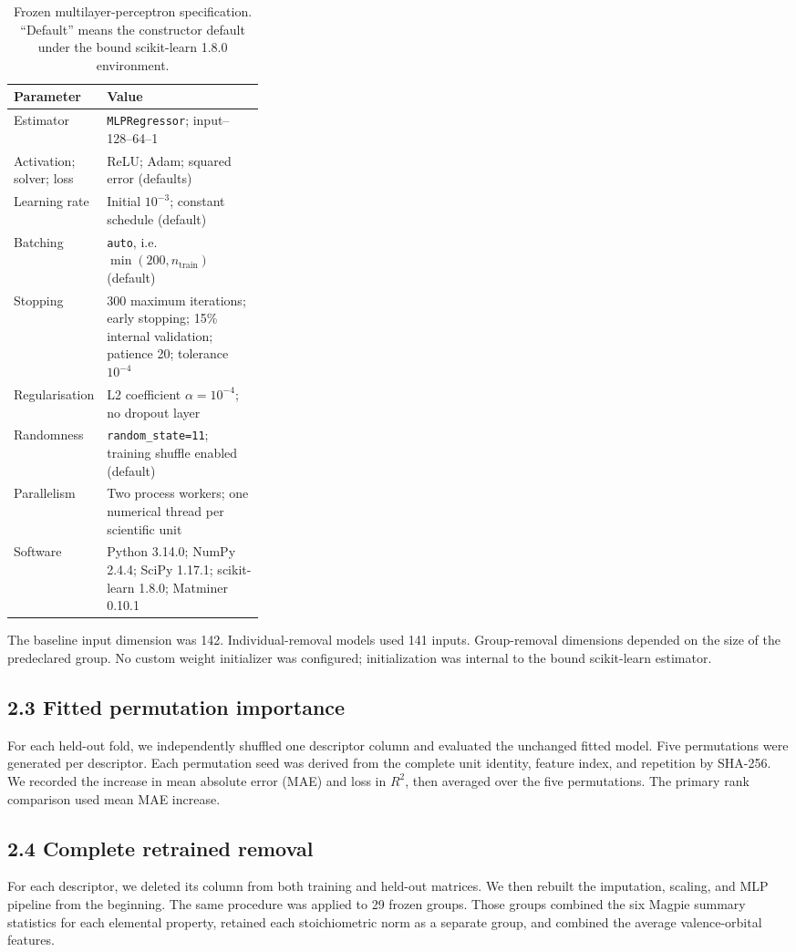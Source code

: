 \documentclass[10pt,a4paper]{article}
\begin{document}
\begin{table}[htbp]\centering\small
\caption{Frozen multilayer-perceptron specification. ``Default'' means the constructor default under the bound scikit-learn 1.8.0 environment.}
\begin{tabularx}{\linewidth}{@{}p{0.32\linewidth}X@{}}\toprule
Parameter & Value\\\midrule
Estimator & \texttt{MLPRegressor}; input--128--64--1\\
Activation; solver; loss & ReLU; Adam; squared error (defaults)\\
Learning rate & Initial $10^{-3}$; constant schedule (default)\\
Batching & \texttt{auto}, i.e. $\min(200,n_{\mathrm{train}})$ (default)\\
Stopping & 300 maximum iterations; early stopping; 15\% internal validation; patience 20; tolerance $10^{-4}$\\
Regularisation & L2 coefficient $\alpha=10^{-4}$; no dropout layer\\
Randomness & \texttt{random\_state=11}; training shuffle enabled (default)\\
Parallelism & Two process workers; one numerical thread per scientific unit\\
Software & Python 3.14.0; NumPy 2.4.4; SciPy 1.17.1; scikit-learn 1.8.0; Matminer 0.10.1\\\bottomrule
\end{tabularx}\end{table}

The baseline input dimension was 142. Individual-removal models used 141 inputs. Group-removal dimensions depended on the size of the predeclared group. No custom weight initializer was configured; initialization was internal to the bound scikit-learn estimator.

\subsection{2.3 Fitted permutation importance}
For each held-out fold, we independently shuffled one descriptor column and evaluated the unchanged fitted model. Five permutations were generated per descriptor. Each permutation seed was derived from the complete unit identity, feature index, and repetition by SHA-256. We recorded the increase in mean absolute error (MAE) and loss in $R^2$, then averaged over the five permutations. The primary rank comparison used mean MAE increase.

\subsection{2.4 Complete retrained removal}
For each descriptor, we deleted its column from both training and held-out matrices. We then rebuilt the imputation, scaling, and MLP pipeline from the beginning. The same procedure was applied to 29 frozen groups. Those groups combined the six Magpie summary statistics for each elemental property, retained each stoichiometric norm as a separate group, and combined the average valence-orbital features.
\end{document}
